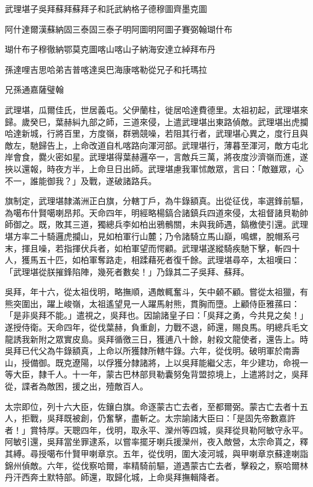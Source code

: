 
\begin{pinyinscope}
武理堪子吳拜蘇拜蘇拜子和託武納格子德穆圖齊墨克圖

阿什達爾漢蘇納固三泰固三泰子明阿圖明阿圖子賽弼翰瑚什布

瑚什布子穆徹納鄂莫克圖喀山喀山子納海安達立綽拜布丹

孫達哩吉思哈弟吉普喀達吳巴海康喀勒從兄子和托瑪拉

兄孫通嘉薩璧翰

武理堪，瓜爾佳氏，世居義屯。父伊蘭柱，徙居哈達費德里。太祖初起，武理堪來歸。歲癸巳，葉赫糾九部之師，三道來侵，上遣武理堪出東路偵敵。武理堪出虎攔哈達新城，行將百里，方度嶺，群鴉競噪，若阻其行者，武理堪心異之，度行且與敵左，馳歸告上，上命改道自札喀路向渾河部。武理堪行，薄暮至渾河，敵方屯北岸會食，爨火密如星。武理堪得葉赫邏卒一，言敵兵三萬，將夜度沙濟嶺而進，遂挾以還報，時夜方半，上命旦日出師。武理堪慮我軍怵敵眾，言曰：「敵雖眾，心不一，誰能御我？」及戰，遂破諸路兵。

旗制定，武理堪隸滿洲正白旗，分轄丁戶，為牛錄額真。出從征伐，率選鋒前驅，為噶布什賢噶喇昂邦。天命四年，明經略楊鎬合諸鎮兵四道來侵，太祖督諸貝勒帥師御之。既，敗其三道，獨總兵李如柏出鴉鶻關，未與我師遇，鎬檄使引還。武理堪方率二十騎邏虎攔山，見如柏軍行山麓；乃令諸騎立馬山巔，鳴螺，脫帽系弓末，揮且噪，若指揮伏兵者，如柏軍望而愕顧。武理堪遂縱騎疾馳下擊，斬四十人，獲馬五十匹，如柏軍奪路走，相蹂藉死者復千餘。武理堪尋卒，太祖嘆曰：「武理堪從朕摧鋒陷陣，幾死者數矣！」乃錄其二子吳拜、蘇拜。

吳拜，年十六，從太祖伐明，略撫順，遇敵輒奮斗，矢中顙不顧。嘗從太祖獵，有熊突圍出，躍上峻嶺，太祖遙望見一人躍馬射熊，貫胸而墮。上顧侍臣雅蓀曰：「是非吳拜不能。」遣視之，吳拜也。因諭諸皇子曰：「吳拜之勇，今共見之矣！」遂授侍衛。天命四年，從伐葉赫，負重創，力戰不退，師還，賜良馬。明總兵毛文龍誘我新附之眾實皮島。吳拜循徼三日，獲逋八十餘，射殺文龍使者，還告上。時吳拜已代父為牛錄額真，上命以所獲隸所轄牛錄。六年，從伐明。破明軍於南壽山，授備御。既克遼陽，以俘獲分隸諸將，上以吳拜能繼父志，年少建功，命視一等大臣，隸千人。十一年，蒙古巴林部貝勒囊努兔背盟掠境上，上遣將討之，吳拜從，諜者為敵困，援之出，殪敵百人。

太宗即位，列十六大臣，佐鑲白旗。命逐蒙古亡去者，至都爾弼。蒙古亡去者十五人，拒戰，吳拜既被創，仍奮擊，盡斬之。太宗諭諸大臣曰：「是固先帝數嘉許者！」賞特厚。天聰四年，伐明，取永平、灤州等四城，吳拜從貝勒阿敏守永平。阿敏引還，吳拜當坐罪逮系，以嘗率擺牙喇兵援灤州，夜入敵營，太宗命貰之，釋其縛。尋授噶布什賢甲喇章京。五年，從伐明，圍大凌河城，與甲喇章京蘇達喇詣錦州偵敵。六年，從伐察哈爾，率精騎前驅，道遇蒙古亡去者，擊殺之，察哈爾林丹汗西奔土默特部。師還，取歸化城，上命吳拜撫輯降者。


\end{pinyinscope}
